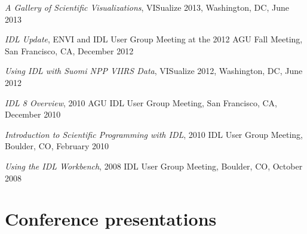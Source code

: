 \documentclass[letterpaper]{resume}
\begin{document}
\begin{enumerate}[{[}1{]}]
  \item \textit{A Gallery of Scientific Visualizations}, {VISualize} 2013,
    Washington, DC, June 2013

  \item \textit{IDL Update}, ENVI and IDL User Group Meeting at the 2012
    AGU Fall Meeting, San Francisco, CA, December 2012

  \item \textit{Using IDL with Suomi NPP VIIRS Data}, {VISualize} 2012,
    Washington, DC, June 2012

  \item \textit{IDL 8 Overview}, 2010 AGU IDL User Group Meeting, San
    Francisco, CA, December 2010

  \item \textit{Introduction to Scientific Programming with IDL}, 2010 IDL
    User Group Meeting, Boulder, CO, February 2010

  \item \textit{Using the IDL Workbench}, 2008 IDL User Group Meeting,
    Boulder, CO, October 2008

\end{enumerate}


\section{Conference presentations}
\vspace{0.5em}
\end{document}
